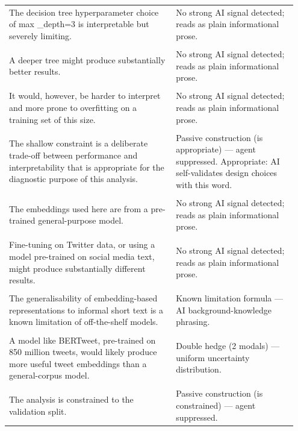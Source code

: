 \documentclass[11pt]{article}
\begin{document}
\begin{longtable}{|p{0.55\linewidth}|p{0.40\linewidth}|}
\hline
\rule{0pt}{3.5cm} & \\
\hline
The decision tree hyperparameter choice of max \_depth=3 is interpretable but severely limiting. & No strong AI signal detected; reads as plain informational prose. \\[2pt]
\hline
\rule{0pt}{3.5cm} & \\
\hline
A deeper tree might produce substantially better results. & No strong AI signal detected; reads as plain informational prose. \\[2pt]
\hline
\rule{0pt}{3.5cm} & \\
\hline
It would, however, be harder to interpret and more prone to overfitting on a training set of this size. & No strong AI signal detected; reads as plain informational prose. \\[2pt]
\hline
\rule{0pt}{3.5cm} & \\
\hline
The shallow constraint is a deliberate trade-off between performance and interpretability that is appropriate for the diagnostic purpose of this analysis. & Passive construction (is appropriate) --- agent suppressed. Appropriate: AI self-validates design choices with this word. \\[2pt]
\hline
\rule{0pt}{3.5cm} & \\
\hline
The embeddings used here are from a pre-trained general-purpose model. & No strong AI signal detected; reads as plain informational prose. \\[2pt]
\hline
\rule{0pt}{3.5cm} & \\
\hline
Fine-tuning on Twitter data, or using a model pre-trained on social media text, might produce substantially different results. & No strong AI signal detected; reads as plain informational prose. \\[2pt]
\hline
\rule{0pt}{3.5cm} & \\
\hline
The generalisability of embedding-based representations to informal short text is a known limitation of off-the-shelf models. & Known limitation formula --- AI background-knowledge phrasing. \\[2pt]
\hline
\rule{0pt}{3.5cm} & \\
\hline
A model like BERTweet, pre-trained on 850 million tweets, would likely produce more useful tweet embeddings than a general-corpus model. & Double hedge (2 modals) --- uniform uncertainty distribution. \\[2pt]
\hline
\rule{0pt}{3.5cm} & \\
\hline
The analysis is constrained to the validation split. & Passive construction (is constrained) --- agent suppressed. \\[2pt]

\end{longtable}
\end{document}
